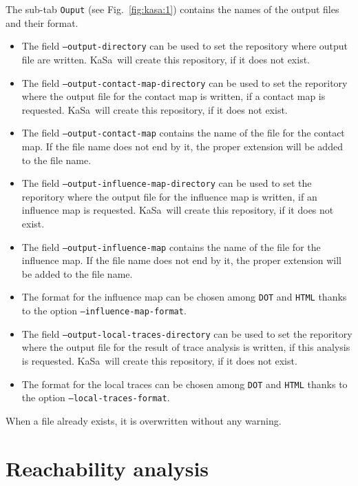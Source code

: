 \documentclass[11pt]{book}
\def\KaSa{\textsf{KaSa}}
\begin{document}
The sub-tab \texttt{Ouput} (see Fig.~\ref{fig:kasa:1}) contains the names of the output files and their format.

\begin{itemize}
\item The field \texttt{--output-directory} can be used to set the repository where output file are written. \KaSa~will create this repository, if it does not exist.
\item The field \texttt{--output-contact-map-directory} can be used to set the reporitory where the output file for the contact map is written, if a contact map is requested. \KaSa~will create this repository, if it does not exist.
\item The field \texttt{--output-contact-map} contains the name of the file for the contact map. If the file name does not end by it, the proper extension will be added to the file name.
\item The field \texttt{--output-influence-map-directory} can be used to set the reporitory where the output file for the influence map is written, if an influence map is requested. \KaSa~will create this repository, if it does not exist.
\item The field \texttt{--output-influence-map} contains the name of the file for the influence map. If the file name does not end by it, the proper extension will be added to the file name.
\item The format for the influence map can be chosen among \texttt{DOT} and \texttt{HTML} thanks to the option \texttt{--influence-map-format}.
\item The field \texttt{--output-local-traces-directory} can be used to set the reporitory where the output file for the result of trace analysis is written, if this analysis is requested. \KaSa~will create this repository, if it does not exist.
\item The format for the local traces can be chosen among \texttt{DOT} and \texttt{HTML} thanks to the option \texttt{--local-traces-format}.


\end{itemize}

When a file already exists, it is overwritten without any warning.

\section{Reachability analysis}
\end{document}
